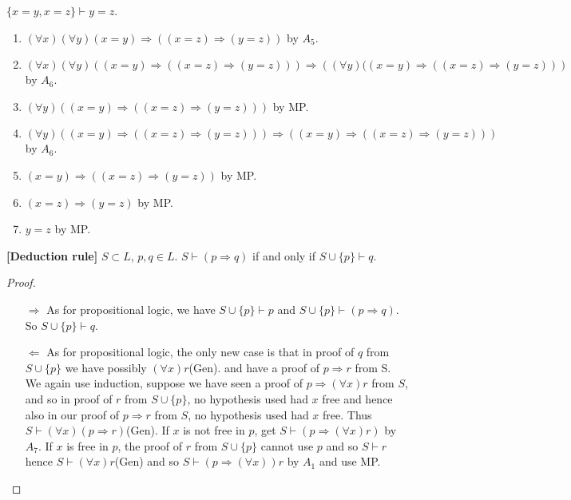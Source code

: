 \begin{example}
$\{x=y, x=z\} \vdash y=z$.
\begin{enumerate}
\item $(\forall x)(\forall y)(x=y) \Rightarrow ((x=z) \Rightarrow (y=z))$ by $A_5$.\\
\item $(\forall x)(\forall y)((x=y) \Rightarrow ((x=z) \Rightarrow (y=z))) \Rightarrow \left((\forall y)((x=y) \Rightarrow ((x=z) \Rightarrow (y=z))\right)$ by $A_6$.\\
\item $(\forall y)((x=y) \Rightarrow ((x=z) \Rightarrow (y=z)))$ by MP.\\
\item $(\forall y)((x=y) \Rightarrow ((x=z) \Rightarrow (y=z))) \Rightarrow ((x=y) \Rightarrow ((x=z) \Rightarrow (y=z)))$ by $A_6$.\\
\item $(x=y) \Rightarrow ((x=z) \Rightarrow (y=z))$ by MP.\\
\item $(x=z) \Rightarrow (y=z)$ by MP.\\
\item $y=z$ by MP.
\end{enumerate}
\end{example}
\begin{proposition}{\bf [Deduction rule]} $S \subset L$, $p,q \in L$. $S \vdash (p \Rightarrow q)$ if and only if $S \cup \{p\} \vdash q$.
\end{proposition}
\begin{proof}
\begin{enumerate}
\item[$\Rightarrow$] As for propositional logic, we have $S \cup \{p\} \vdash p$ and $S \cup \{p\} \vdash (p \Rightarrow q)$. So $S \cup \{p\} \vdash q$.\\
\item[$\Leftarrow$] As for propositional logic, the only new case is that in proof of $q$ from $S \cup \{p\}$ we have possibly $(\forall x)r$(Gen). and have a proof of $p \Rightarrow r$ from S.\\
    We again use induction, suppose we have seen a proof of $p \Rightarrow (\forall x)r$ from $S$, and so in proof of $r$ from $S \cup \{p\}$, no hypothesis used had $x$ free and hence also in our proof of $p \Rightarrow r$ from $S$, no hypothesis used had $x$ free. Thus $S \vdash (\forall x)(p \Rightarrow r)$(Gen). If $x$ is not free in $p$, get $S \vdash (p \Rightarrow (\forall x)r )$ by $A_7$. If $x$ is free in $p$, the proof of $r$ from $S \cup \{p\}$ cannot use $p$ and so $S \vdash r$ hence $S \vdash (\forall x)r$(Gen) and so $S \vdash (p \Rightarrow (\forall x))r$ by $A_1$ and use MP.
\end{enumerate}
\end{proof}
